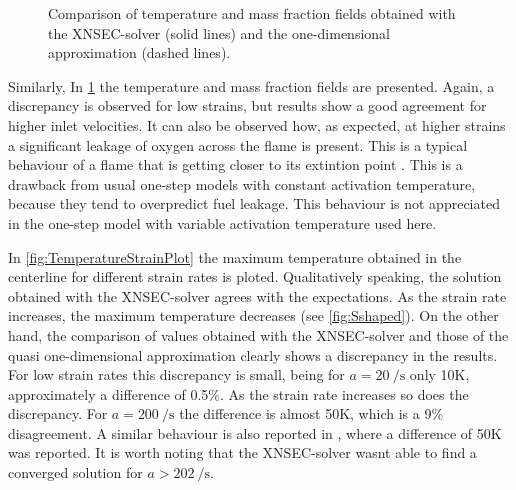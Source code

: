 
 \tikzexternaldisable
 \begin{figure}[p]
 	\centering
 	\caption[Comparison of temperature and mass fraction fields obtained with the XNSEC-solver and the one-dimensional approximation.]{Comparison of temperature and mass fraction fields obtained with the XNSEC-solver (solid lines) and the one-dimensional approximation (dashed lines).}
 	\label{fig:BoSSS_1D_Comparison}
 \end{figure}
 \tikzexternalenable
Similarly, In \cref{fig:BoSSS_1D_Comparison} the temperature and mass fraction fields are presented. Again, a discrepancy is observed for low strains, but results show a good agreement for higher inlet velocities. It can also be observed how, as expected, at higher strains a significant leakage of oxygen across the flame is present. This is a typical behaviour of a flame that is getting closer to its extintion point \cite{fernandez-tarrazoSimpleOnestepChemistry2006}.  This is a drawback from usual one-step models with constant activation temperature, because they tend to overpredict fuel leakage. This behaviour is not appreciated in the one-step model with variable activation temperature used here. 
 
 
 
In \cref{fig:TemperatureStrainPlot} the maximum temperature obtained in the centerline for different strain rates is ploted. Qualitatively speaking, the solution obtained with the XNSEC-solver agrees with the expectations. As the strain rate increases, the maximum temperature decreases (see \cref{fig:Sshaped}). On the other hand, the comparison of values obtained with the XNSEC-solver and those of the quasi one-dimensional approximation clearly shows a discrepancy in the results. For low strain rates this discrepancy is small, being for $a = \SI{20}{\per\second}$ only 10K, approximately a difference of 0.5\%. As the strain rate increases so does the discrepancy. For $a = \SI{200}{\per\second}$ the difference is almost 50K, which is a 9\% disagreement. A similar behaviour is also reported in \cite{frouzakisTwodimensionalDirectNumerical1998}, where a difference of 50K was reported. It is worth noting that the XNSEC-solver wasnt able to find a converged solution for $a > \SI{202}{\per\second}$. 

